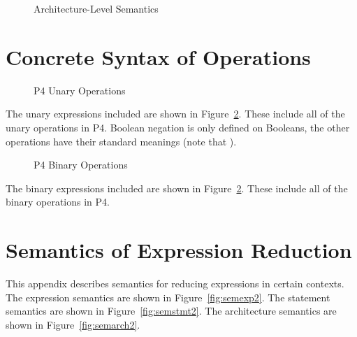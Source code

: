 \documentclass[UTF8]{article}
\begin{document}
\begin{figure}[ht!]
\caption{Architecture-Level Semantics}
\label{fig:semarch}
\end{figure}

\printbibliography

\clearpage
\appendix
\section{Concrete Syntax of Operations}
\label{app:op}
\begin{figure}[ht!]
\centering\ottgrammartabular{
\ottunop\ottafterlastrule
}
\caption{P4 Unary Operations}
\label{fig:unop}
\end{figure}

The unary expressions included are shown in Figure~\ref{fig:unop}. These include all of the unary operations in P4. Boolean negation is only defined on Booleans, the other operations have their standard meanings (note that ).

\newpage
\begin{figure}[ht!]
\centering\ottgrammartabular{
\ottbinop\ottafterlastrule
}
\caption{P4 Binary Operations}
\label{fig:binop}
\end{figure}

The binary expressions included are shown in Figure~\ref{fig:unop}. These include all of the binary operations in P4.

\section{Semantics of Expression Reduction}
\label{app:exp}
This appendix describes semantics for reducing expressions in certain contexts. The expression semantics are shown in Figure~\ref{fig:semexp2}. The statement semantics are shown in Figure~\ref{fig:semstmt2}. The architecture semantics are shown in Figure~\ref{fig:semarch2}.
\end{document}
